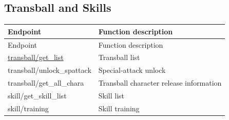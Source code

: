 \subsection{Transball and Skills}

\begin{longtable}{>{\ttfamily}p{}p{}}
\toprule
Endpoint & Function description \\
\midrule
\endfirsthead%

\toprule
Endpoint & Function description \\
\midrule
\endhead%

\hyperref[subsec:api_transball_get_list]
    {transball/get\_list}
    & Transball list \\

transball/unlock\_spattack
    & Special-attack unlock \\

transball/get\_all\_chara
    & Transball character release information \\

skill/get\_skill\_list
    & Skill list \\

skill/training
    & Skill training \\

\bottomrule
\end{longtable}